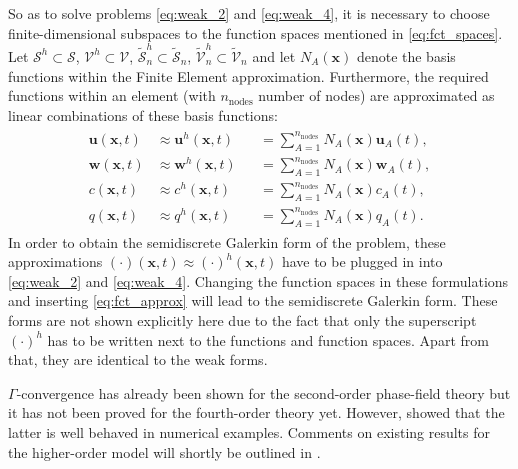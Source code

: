 So as to solve problems \eqref{eq:weak_2} and \eqref{eq:weak_4}, it is necessary to choose finite-dimensional subspaces to the function spaces mentioned in \eqref{eq:fct_spaces}. Let $\bm{\mathcal{S}}^{h}\subset\bm{\mathcal{S}}$, $\bm{\mathcal{V}}^{h}\subset\bm{\mathcal{V}}$, $\tilde{\mathcal{S}}_{n}^{h}\subset\tilde{\mathcal{S}}_{n}$, $\tilde{\mathcal{V}}_{n}^{h}\subset\tilde{\mathcal{V}}_{n}$ and let $N_{A}\left(\mathbf{x}\right)$ denote the basis functions within the Finite Element approximation. Furthermore, the required functions within an element (with $n_{\text{nodes}}$ number of nodes) are approximated as linear combinations of these basis functions:
\begin{equation} \label{eq:fct_approx}
	\begin{aligned}
	\begin{alignedat}{2}
		\mathbf{u}\left(\mathbf{x},t\right) &\approx \mathbf{u}^{h}\left(\mathbf{x},t\right) &&= \sum\limits_{A=1}^{n_{\text{nodes}}}N_{A}\left(\mathbf{x}\right)\mathbf{u}_{A}\left(t\right), \\
		\mathbf{w}\left(\mathbf{x},t\right) &\approx \mathbf{w}^{h}\left(\mathbf{x},t\right) &&= \sum\limits_{A=1}^{n_{\text{nodes}}}N_{A}\left(\mathbf{x}\right)\mathbf{w}_{A}\left(t\right), \\
		c\left(\mathbf{x},t\right) &\approx c^{h}\left(\mathbf{x},t\right) &&= \sum\limits_{A=1}^{n_{\text{nodes}}}N_{A}\left(\mathbf{x}\right)c_{A}\left(t\right), \\
		q\left(\mathbf{x},t\right) &\approx q^{h}\left(\mathbf{x},t\right) &&= \sum\limits_{A=1}^{n_{\text{nodes}}}N_{A}\left(\mathbf{x}\right)q_{A}\left(t\right).
	\end{alignedat}
	\end{aligned}
\end{equation}
In order to obtain the semidiscrete Galerkin form of the problem, these approximations $\left(\cdot\right)\left(\mathbf{x},t\right)\approx\left(\cdot\right)^{h}\left(\mathbf{x},t\right)$ have to be plugged in into \eqref{eq:weak_2} and \eqref{eq:weak_4}. Changing the function spaces in these formulations and inserting \eqref{eq:fct_approx} will lead to the semidiscrete Galerkin form. These forms are not shown explicitly here due to the fact that only the superscript $\left(\cdot\right)^{h}$ has to be written next to the functions and function spaces. Apart from that, they are identical to the weak forms.

$\Gamma$-convergence has already been shown for the second-order phase-field theory but it has not been proved for the fourth-order theory yet. However, \citet{02_PF_HO_brittle} showed that the latter is well behaved in numerical examples. Comments on existing results for the higher-order model will shortly be outlined in .

